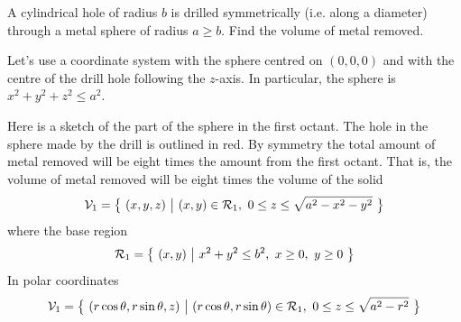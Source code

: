 \begin{eg}\label{eg polar volume}
A cylindrical hole of radius $b$ is drilled symmetrically (i.e. along
a diameter) through a metal sphere of radius $a\ge b$. Find 
the volume of metal removed.

\soln
Let's use a coordinate system with the sphere centred on $(0,0,0)$
and with the centre of the drill hole following the $z$-axis.
In particular, the sphere is $x^2+y^2+z^2\le a^2$.

Here is a sketch of the part of the sphere in the first octant.
The hole in the sphere made by the drill is outlined in red. By symmetry
the total amount of metal removed will be eight times the amount
from the first octant.
That is, the volume of metal removed will be eight times the volume of
the solid
\begin{equation*}
\mathcal{V}_1 = \big\{ \ (x,y,z)\ \big|\ (x,y)\in\mathcal{R}_1,\ 0\le z\le\sqrt{a^2-x^2-y^2}\ \big\}
\end{equation*}
where the base region 
\begin{equation*}
\mathcal{R}_1 = \big\{ \ (x,y)\ \big|\ x^2+y^2\le b^2,\ x\ge 0,\ y\ge 0\ \big\}
\end{equation*}
In polar coordinates
\begin{align*}
\cV_1 &= \Set{(r\cos\theta,r\sin\theta,z)}{(r\cos\theta,r\sin\theta)\in\cR_1,\ 
                   0\le z\le\sqrt{a^2-r^2}} \\

\end{align*}
\end{eg}
